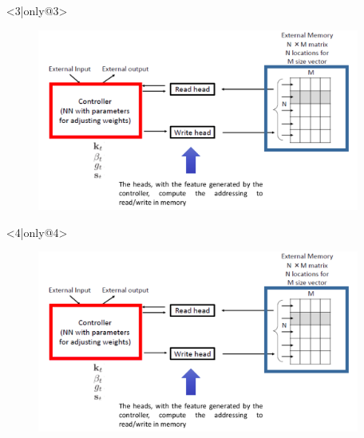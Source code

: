 \documentclass{beamer}
\begin{document}
\begin{frame}
\begin{itemize}
\begin{figure}[!h]
\begin{center}
 			\end{center}
\end{figure}
\item[] <3|only@3> 
\begin{figure}[!h]
 			\begin{center}
 			\includegraphics[scale=0.18]{"Immagini/MANN.png"}
 			\end{center}
\end{figure}
\item[] <4|only@4> 
\begin{figure}[!h]
 			\begin{center}
 			\includegraphics[scale=0.18]{"Immagini/MANN.png"}
 			\end{center}
\end{figure}
\end{itemize}
\end{frame}
\end{document}
